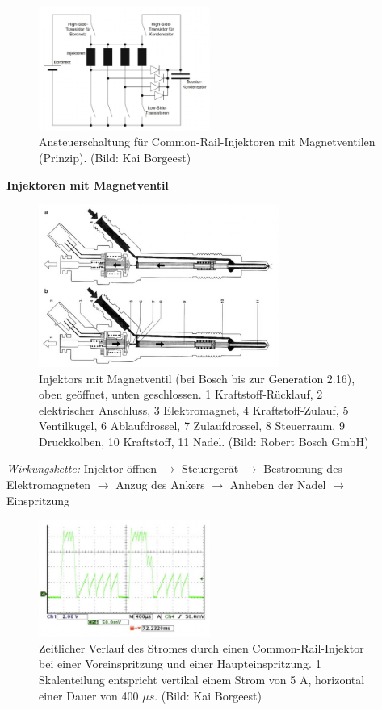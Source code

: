 \begin{figure}[!ht]%
\centering
\includegraphics[width=0.5\textwidth]{images/EDC/EDC-8.pdf}
\caption{Ansteuerschaltung für Common-Rail-Injektoren mit Magnetventilen
(Prinzip). (Bild: Kai Borgeest)}
\end{figure}

\textbf{Injektoren mit Magnetventil}

\begin{figure}[!ht]%
\centering
\includegraphics[width=0.7\textwidth]{images/EDC/EDC-6.pdf}
\caption{Injektors mit Magnetventil (bei Bosch bis zur Generation 2.16),
oben geöffnet, unten geschlossen. 1 Kraftstoff-Rücklauf, 2 elektrischer
Anschluss, 3 Elektromagnet, 4 Kraftstoff-Zulauf, 5 Ventilkugel, 6
Ablaufdrossel, 7 Zulaufdrossel, 8 Steuerraum, 9 Druckkolben, 10
Kraftstoff, 11 Nadel. (Bild: Robert Bosch GmbH)}
\end{figure}

\emph{Wirkungskette:} Injektor öffnen $\to$ Steuergerät $\to$
Bestromung des Elektromagneten $\to$ Anzug des Ankers $\to$ Anheben
der Nadel $\to$ Einspritzung

\newpage

\begin{figure}[!ht]%
\centering
\includegraphics[width=0.5\textwidth]{images/EDC/EDC-7.pdf}
\caption{Zeitlicher Verlauf des Stromes durch einen Common-Rail-Injektor
bei einer Voreinspritzung und einer Haupteinspritzung. 1 Skalenteilung
entspricht vertikal einem Strom von 5 A, horizontal einer Dauer von 400
$\mu s$. (Bild: Kai Borgeest)}
\end{figure}

